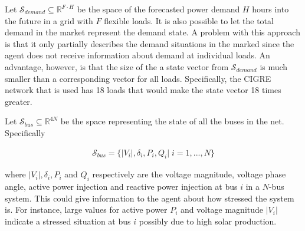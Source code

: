\documentclass[class=book, crop=false]{standalone}
\begin{document}
Let $\mathcal{S}_{demand} \subseteq \mathbb{R}^{F\cdot H}$ be the space of the forecasted power demand $H$ hours into the future in a grid with $F$ flexible loads. It is also possible to let the total demand in the market represent the demand state. A problem with this approach is that it only partially describes the demand situations in the marked since the agent does not receive information about demand at individual loads. An advantage, however, is that the size of the a state vector from  $\mathcal{S}_{demand}$ is much smaller than a corresponding vector for all loads. Specifically, the CIGRE network that is used has 18 loads that would make the state vector 18 times greater.



Let $\mathcal{S}_{bus} \subseteq \mathbb{R}^{4N}$ be the space representing the state of all the buses in the net. Specifically

\begin{equation}
   \begin{aligned}
   \label{eq:problem:bus_state}
\mathcal{S}_{bus} = \{|V_{i}|, \delta_{i}, P_{i}, Q_{i} |\; i = 1,...,N\}
    \end{aligned} 
\end{equation}

where $|V_{i}|,\delta_{i}, P_{i}$ and $Q_{i}$ respectively are the voltage magnitude, voltage phase angle, active power injection and reactive power injection at bus $i$ in a $N$-bus system. This could give information to the agent about how stressed the system is. For instance, large values for active power $P_{i}$ and voltage magnitude $|V_{i}|$ indicate a stressed situation at bus $i$ possibly due to high solar production. 
\end{document}
